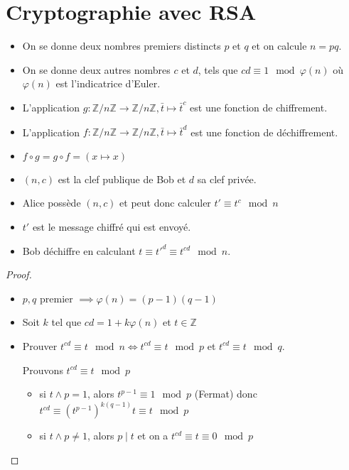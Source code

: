 \documentclass[french]{article}
\newcommand{\Z}{\mathbb{Z}}
\begin{document}
\section{Cryptographie avec RSA}

  \begin{itemize}
    \item On se donne deux nombres premiers distincts $p$ et $q$ et on
      calcule $n=pq$.
    \item On se donne deux autres nombres $c$ et $d$, tels que $cd
      \equiv 1 \mod \varphi(n)$ où $\varphi(n)$ est l'indicatrice
      d'Euler.
    \item L'application $g:\Z/n\Z\to\Z/n\Z, \bar{t} \mapsto \bar{t}^c$
      est une fonction de chiffrement.
    \item L'application $f:\Z/n\Z\to\Z/n\Z, \bar{t} \mapsto \bar{t}^d$
      est une fonction de déchiffrement.
    \item $f\circ g = g\circ f = (x\mapsto x)$
  \end{itemize}

  \begin{itemize}
    \item $(n,c)$ est la clef publique de Bob et $d$ sa clef privée.
    \item Alice possède $(n,c)$ et peut donc calculer $t' \equiv t^c
      \mod n$
    \item $t'$ est le message chiffré qui est envoyé.
    \item Bob déchiffre en calculant $t \equiv t'^{d} \equiv t^{cd}
      \mod n$.
  \end{itemize}

  \begin{proof}
    \begin{itemize}
      \item $p,q$ premier $\implies \varphi(n) = (p-1)(q-1)$
      \item Soit $k$ tel que $cd = 1 +k\varphi(n)$ et $t\in\Z$
      \item Prouver $t^{cd} \equiv t \mod n \iff t^{cd} \equiv t \mod p$
        et $t^{cd} \equiv t \mod q$.

        Prouvons $t^{cd} \equiv t \mod p$
        \begin{itemize}
          \item si $t\wedge p = 1$, alors $t^{p-1} \equiv 1 \mod p$
            (Fermat) donc $t^{cd} \equiv (t^{p-1})^{k(q-1)}t \equiv t
            \mod p$
          \item si $t\wedge p \neq 1$, alors $p\mid t$ et on a $t^{cd}
            \equiv t \equiv 0 \mod p$
        \end{itemize}
    \end{itemize}
  \end{proof}
\end{document}
